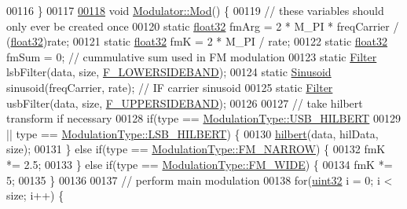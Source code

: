 \begin{DoxyCode}
00116     \}
00117 
\hypertarget{Modulator_8hpp_source_l00118}{}\hyperlink{classradio_1_1Modulator_ab5eac6e4900579486b5871b48e64cdab}{00118}     \textcolor{keywordtype}{void} \hyperlink{classradio_1_1Modulator_ab5eac6e4900579486b5871b48e64cdab}{Modulator::Mod}() \{
00119         \textcolor{comment}{// these variables should only ever be created once}
00120         \textcolor{keyword}{static} \hyperlink{definitions_8hpp_aacdc525d6f7bddb3ae95d5c311bd06a1}{float32} fmArg = 2 * M\_PI * freqCarrier / (\hyperlink{definitions_8hpp_aacdc525d6f7bddb3ae95d5c311bd06a1}{float32})rate;
00121         \textcolor{keyword}{static} \hyperlink{definitions_8hpp_aacdc525d6f7bddb3ae95d5c311bd06a1}{float32} fmK = 2 * M\_PI / rate;
00122         \textcolor{keyword}{static} \hyperlink{definitions_8hpp_aacdc525d6f7bddb3ae95d5c311bd06a1}{float32} fmSum = 0;  \textcolor{comment}{// cummulative sum used in FM modulation}
00123         \textcolor{keyword}{static} \hyperlink{classradio_1_1Filter}{Filter} lsbFilter(data, size, \hyperlink{namespaceradio_a0ffd57d5a11ff70a1f55dbdc8ebe098d}{F\_LOWERSIDEBAND});
00124         \textcolor{keyword}{static} \hyperlink{classradio_1_1Sinusoid}{Sinusoid} sinusoid(freqCarrier, rate);  \textcolor{comment}{// IF carrier sinusoid}
00125         \textcolor{keyword}{static} \hyperlink{classradio_1_1Filter}{Filter} usbFilter(data, size, \hyperlink{namespaceradio_a0ec4548711b6d6ed6867c70b3fc2a413}{F\_UPPERSIDEBAND});
00126 
00127         \textcolor{comment}{// take hilbert transform if necessary}
00128         \textcolor{keywordflow}{if}(type == \hyperlink{namespaceradio_a46fb7299001138f28b7f69975c58399ea1b14284e455bf5c311de662665312d13}{ModulationType::USB\_HILBERT}
00129                 || type == \hyperlink{namespaceradio_a46fb7299001138f28b7f69975c58399ea18f970daa5b5a8f72cbd45f7b49a6b6a}{ModulationType::LSB\_HILBERT}) \{
00130             \hyperlink{namespaceradio_a285a47b4ed81e5662d2b6b4bae0188d0}{hilbert}(data, hilData, size);
00131         \} \textcolor{keywordflow}{else} \textcolor{keywordflow}{if}(type == \hyperlink{namespaceradio_a46fb7299001138f28b7f69975c58399ea7b4b1e7876b8d9de5b77b9264fbe556a}{ModulationType::FM\_NARROW}) \{
00132             fmK *= 2.5;
00133         \} \textcolor{keywordflow}{else} \textcolor{keywordflow}{if}(type == \hyperlink{namespaceradio_a46fb7299001138f28b7f69975c58399eafabee3b32b363b14950cb5f5b61e998c}{ModulationType::FM\_WIDE}) \{
00134             fmK *= 5;
00135         \}
00136 
00137         \textcolor{comment}{// perform main modulation}
00138         \textcolor{keywordflow}{for}(\hyperlink{definitions_8hpp_a1134b580f8da4de94ca6b1de4d37975e}{uint32} i = 0; i < size; i++) \{

\end{DoxyCode}
